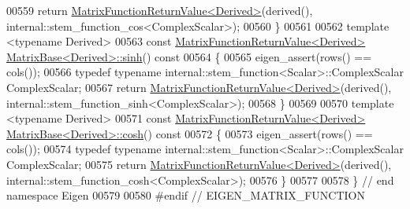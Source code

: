 \begin{DoxyCode}
00559   \textcolor{keywordflow}{return} \hyperlink{class_eigen_1_1_matrix_function_return_value}{MatrixFunctionReturnValue<Derived>}(derived(), 
      internal::stem\_function\_cos<ComplexScalar>);
00560 \}
00561 
00562 \textcolor{keyword}{template} <\textcolor{keyword}{typename} Derived>
00563 \textcolor{keyword}{const} \hyperlink{class_eigen_1_1_matrix_function_return_value}{MatrixFunctionReturnValue<Derived>} 
      \hyperlink{group___core___module_class_eigen_1_1_matrix_base}{MatrixBase<Derived>::sinh}()\textcolor{keyword}{ const}
00564 \textcolor{keyword}{}\{
00565   eigen\_assert(rows() == cols());
00566   \textcolor{keyword}{typedef} \textcolor{keyword}{typename} internal::stem\_function<Scalar>::ComplexScalar ComplexScalar;
00567   \textcolor{keywordflow}{return} \hyperlink{class_eigen_1_1_matrix_function_return_value}{MatrixFunctionReturnValue<Derived>}(derived(), 
      internal::stem\_function\_sinh<ComplexScalar>);
00568 \}
00569 
00570 \textcolor{keyword}{template} <\textcolor{keyword}{typename} Derived>
00571 \textcolor{keyword}{const} \hyperlink{class_eigen_1_1_matrix_function_return_value}{MatrixFunctionReturnValue<Derived>} 
      \hyperlink{group___core___module_class_eigen_1_1_matrix_base}{MatrixBase<Derived>::cosh}()\textcolor{keyword}{ const}
00572 \textcolor{keyword}{}\{
00573   eigen\_assert(rows() == cols());
00574   \textcolor{keyword}{typedef} \textcolor{keyword}{typename} internal::stem\_function<Scalar>::ComplexScalar ComplexScalar;
00575   \textcolor{keywordflow}{return} \hyperlink{class_eigen_1_1_matrix_function_return_value}{MatrixFunctionReturnValue<Derived>}(derived(), 
      internal::stem\_function\_cosh<ComplexScalar>);
00576 \}
00577 
00578 \} \textcolor{comment}{// end namespace Eigen}
00579 
00580 \textcolor{preprocessor}{#endif // EIGEN\_MATRIX\_FUNCTION}
\end{DoxyCode}
